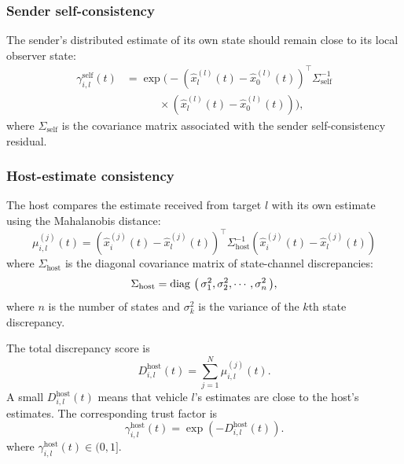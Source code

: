 \documentclass[letterpaper,journal]{IEEEtran}
\def\diag#1{\mathop{{\rm diag}\,\left(\,#1\,\right)}}
\begin{document}
\subsubsection{Sender self-consistency}
The sender's distributed estimate of its own state should remain close to its local observer state:
\begin{equation}
    \begin{aligned}
    \gamma_{i,l}^{\text{self}}(t)
    &=
    \exp\Big(
    -(\hat{x}_l^{(l)}(t)-\hat{x}_0^{(l)}(t))^{\top}
    \Sigma_{\text{self}}^{-1} \\
    &\qquad\quad \times
    (\hat{x}_l^{(l)}(t)-\hat{x}_0^{(l)}(t))
    \Big),
    \end{aligned}
\end{equation}
where $\Sigma_{\text{self}}$ is the covariance matrix associated with the sender self-consistency residual.

\subsubsection{Host-estimate consistency}
The host compares the estimate received from target $l$ with its own estimate using the Mahalanobis distance:
\begin{equation}
    \mu_{i,l}^{(j)}(t) = \left( \hat{x}_i^{(j)}(t) - \hat{x}_l^{(j)}(t) \right)^{\top} \Sigma_{\text{host}}^{-1} \left( \hat{x}_i^{(j)}(t) - \hat{x}_l^{(j)}(t) \right)
    \label{eq_dis_glo}
\end{equation}
where $\Sigma_{\text{host}}$ is the diagonal covariance matrix of state-channel discrepancies:
\begin{equation}
\Sigma_{\text{host}} = \diag{\sigma^2_1, \sigma^2_2, \cdots , \sigma^2_n},
\end{equation}
where $n$ is the number of states and $\sigma^2_k$ is the variance of the $k$th state discrepancy.

The total discrepancy score is
\begin{equation}
    D_{i,l}^{\text{host}}(t) = \sum_{j=1}^N \mu_{i,l}^{(j)}(t).
\end{equation}
A small $D_{i,l}^{\text{host}}(t)$ means that vehicle $l$'s estimates are close to the host's estimates. The corresponding trust factor is
\begin{equation}
    \gamma_{i,l}^{\text{host}}(t) = \exp\left( -D_{i,l}^{\text{host}}(t) \right).
\end{equation}
where $\gamma_{i,l}^{\text{host}}(t) \in (0, 1]$.
\end{document}
